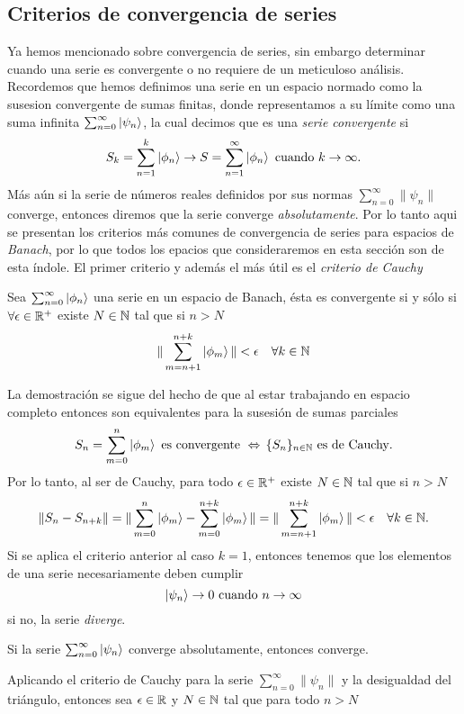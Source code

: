 \documentclass[main.tex]{subfiles}
\begin{document}
\subsection{Criterios de convergencia de series}
\noindent Ya hemos mencionado sobre convergencia de series, sin embargo determinar cuando una serie es convergente o no requiere de un meticuloso análisis. Recordemos que hemos definimos una serie en un espacio normado como la susesion convergente de sumas finitas, donde representamos a su límite como una suma infinita \(\sum_{n=0}^{\infty}\ket{\psi_n}\), la cual decimos que es una \emph{serie convergente} si
\[
    S_k=\sum_{n=1}^k\ket{\phi_n}\rightarrow S=\sum_{n=1}^{\infty}\ket{\phi_n}\text{ cuando }k\rightarrow\infty.
\]
\noindent Más aún si la serie de números reales definidos por sus normas  \(\sum_{n=0}^{\infty}\|\psi_n\|\) converge, entonces diremos que la serie converge \emph{absolutamente}.
Por lo tanto aqui se presentan los criterios más comunes de convergencia de series para espacios de \emph{Banach}, por lo que todos los epacios que consideraremos en esta sección son de esta índole. El primer criterio y además el más útil es el \emph{criterio de Cauchy}
\begin{prop}
  Sea \(\sum_{n=0}^{\infty}\ket{\phi_n}\) una serie en un espacio de Banach, ésta es convergente si y sólo si \(\forall\epsilon\in\mathbb R ^{+}\) existe \(N\in \mathbb N \) tal que si \(n>N\)
  \[
    \|\sum_{m=n+1}^{n+k}\ket{\phi_m}\|<\epsilon\quad\forall k\in \mathbb N 
  \]
\end{prop}
\dem La demostración se sigue del hecho de que al estar trabajando en espacio completo entonces son equivalentes para la susesión de sumas parciales
\[
    S_n=\sum_{m=0}^{n}\ket{\phi_m}\text{ es convergente }\Leftrightarrow\,\{S_n\}_{n\in \mathbb N }\text{ es de Cauchy}.
\]
\noindent Por lo tanto, al ser de Cauchy, para todo \(\epsilon\in\mathbb R ^{+}\) existe \(N\in \mathbb N \) tal que si \(n>N\)
\[
   \|S_n-S_{n+k}\|=\|\sum_{m=0}^{n}\ket{\phi_m}-\sum_{m=0}^{n+k}\ket{\phi_m}\|=\|\sum_{m=n+1}^{n+k}\ket{\phi_m}\|<\epsilon\quad\forall k\in \mathbb N .
\]
\obs Si se aplica el criterio anterior al caso \(k=1\), entonces tenemos que los elementos de una serie necesariamente deben cumplir
\[
    \ket{\psi_n}\rightarrow 0\text{ cuando } n\to\infty
\]
si no, la serie \emph{diverge}.
\QED
\begin{prop}
  Si la serie \(\sum_{n=0}^{\infty}\ket{\psi_n}\) converge absolutamente, entonces converge.
  \end{prop}
\dem Aplicando el criterio de Cauchy para la serie \(\sum_{n=0}^{\infty}\|\psi_n\|\) y la desigualdad del triángulo, entonces sea \(\epsilon\in\mathbb R \) y \(N\in \mathbb N \) tal que para todo \(n>N\)
\end{document}
